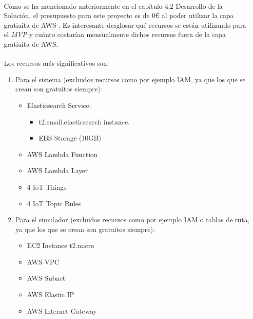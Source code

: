 \documentclass[../../memoria.tex]{subfiles}
\begin{document}
\paragraph{}
Como se ha mencionado anteriormente en el capítulo 4.2 Desarrollo de la Solución, el presupuesto para este proyecto es de 0€ al poder utilizar la capa gratiuita de AWS \cite{awsfreetier}. Es interesante desglosar qué recursos se están utilizando para el \textit{MVP} y cuánto costarían mensualmente dichos recursos fuera de la capa gratiuita de AWS.

\paragraph{}
Los recursos más significativos son:

\begin{enumerate}

    \item Para el sistema (excluidos recursos como por ejemplo IAM, ya que los que se crean son gratuitos siempre):

          \begin{itemize}
              \item Elasticsearch Service:
                    \begin{itemize}
                        \item t2.small.elasticsearch instance.
                        \item EBS Storage (10GB)
                    \end{itemize}

              \item AWS Lambda Function
              \item AWS Lambda Layer
              \item 4 IoT Things
              \item 4 IoT Topic Rules
          \end{itemize}

    \item Para el simulador (excluidos recursos como por ejemplo IAM o tablas de ruta, ya que los que se crean son gratuitos siempre):
          \begin{itemize}
              \item EC2 Instance t2.micro
              \item AWS VPC
              \item AWS Subnet
              \item AWS Elastic IP
              \item AWS Internet Gateway
          \end{itemize}
\end{enumerate}
\end{document}
